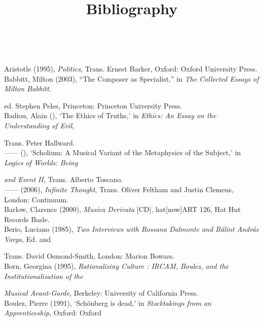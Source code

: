 \paragraph{}
\paragraph{}
\begin{flushleft}
\huge 
\marginpar{}
\title{\textbf{Bibliography}} \\
\end{flushleft}
\vspace{20pt} 
\normalsize
Aristotle (1995), \emph{Politics}, Trans. Ernest Barker, Oxford: Oxford University Press.\\
Babbitt, Milton (2003), ``The Composer as Specialist,'' in \emph{The Collected Essays of Milton Babbitt}.  

ed. Stephen Peles,  Princeton: Princeton University Press.\\
Badiou, Alain (), `The Ethics of Truths,' in \emph{Ethics: An Essay on the Understanding of Evil}, 

Trans. Peter Hallward. \\
------ (), `Scholium: A Musical Variant of the Metaphysics of the Subject,' in \emph{Logics of Worlds: Being}

\emph{and Event II}, Trans. Alberto Toscano. \\
------ (2006), \emph{Infinite Thought}, Trans. Oliver Feltham and Justin Clemens, London: Continuum.\\
Barlow, Clarence (2000), \emph{Musica Derivata} [CD], hat[now]ART 126, Hat Hut Records Basle.\\
Berio, Luciano (1985), \emph{Two Interviews with Rossana Dalmonte and B\'{a}lint Andr\'{a}s Varga},  Ed. and 

Trans. David Osmond-Smith, London: Marion Bowars.\\
Born, Georgina (1995), \emph{Rationalizing Culture : IRCAM, Boulez, and the Institutionalization of the}

\emph{Musical Avant-Garde}, Berkeley: University of California Press.\\
Boulez, Pierre (1991), `Sch\"{o}nberg is dead,' in \emph{Stocktakings from an Apprenticeship}, Oxford: Oxford 

